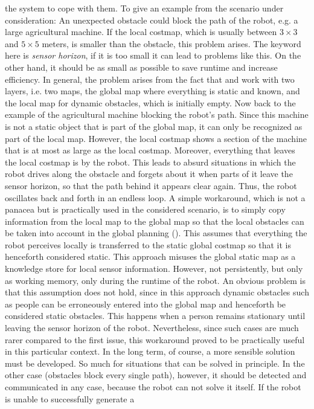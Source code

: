 \documentclass[english, master, utf8]{base/thesis_KBS}
\newcommand{\code}{\collectverb{\codebox}}
\begin{document}
the system to cope with them. To give an example from the scenario under consideration: An unexpected obstacle could block the path of the robot, e.g. a large agricultural machine. 
If the local costmap, which is usually between $3 \times 3$ and $5 \times 5$ meters, is smaller than the obstacle, this problem arises. The keyword here is \textit{sensor horizon},
if it is too small it can lead to problems like this. On the other hand, it should be as small as possible to save runtime and increase efficiency. In general, the problem arises
from the fact that \code{move_base} and \code{move_base_flex} work with two layers, i.e. two maps, the global map where everything is static and known, and the local map for dynamic
obstacles, which is initially empty. Now back to the example of the agricultural machine blocking the robot's path. Since this machine is not a static object that is part of the
global map, it can only be recognized as part of the local map. However, the local costmap shows a section of the machine that is at most as large as the local costmap. Moreover,
everything that leaves the local costmap is  by the robot. This leads to absurd situations in which the robot drives along the obstacle and forgets about it when
parts of it leave the sensor horizon, so that the path behind it appears clear again. Thus, the robot oscillates back and forth in an endless loop. A simple workaround, which is not
a panacea but is practically used in the considered scenario, is to simply copy information from the local map to the global map so that the local obstacles can be taken into
account in the global planning (\code{move_base_flex}). This assumes that everything the robot perceives locally is transferred to the static global costmap so that it is henceforth
considered static. This approach misuses the global static map as a knowledge store for local sensor information. However, not persistently, but only as working memory, only during
the runtime of the robot. An obvious problem is that this assumption does not hold, since in this approach dynamic obstacles such as people can be erroneously entered into the global
map and henceforth be considered static obstacles. This happens when a person remains stationary until leaving the sensor horizon of the robot. Nevertheless, since such cases are much
rarer compared to the first issue, this workaround proved to be practically useful in this particular context. In the long term, of course, a more sensible solution must be developed.\newline
So much for situations that can be solved in principle. In the other case (obstacles block every single path), however, it should be detected and communicated in any case, because the robot can not solve it itself. If the robot is unable to successfully generate a
\end{document}
